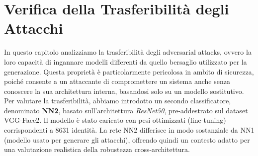 \chapter{Verifica della Trasferibilità degli Attacchi}
    In questo capitolo analizziamo la trasferibilità degli adversarial attacks, ovvero la loro capacità di ingannare modelli differenti da quello bersaglio utilizzato per la generazione. Questa proprietà è particolarmente pericolosa in ambito di sicurezza, poiché consente a un attaccante di compromettere un sistema anche senza conoscere la sua architettura interna, basandosi solo su un modello sostitutivo.
    Per valutare la trasferibilità, abbiamo introdotto un secondo classificatore, denominato \textbf{NN2}, basato sull’architettura \textit{ResNet50}, pre-addestrato sul dataset VGG-Face2. Il modello è stato caricato con pesi ottimizzati (fine-tuning) corrispondenti a 8631 identità. La rete NN2 differisce in modo sostanziale da NN1 (modello usato per generare gli attacchi), offrendo quindi un contesto adatto per una valutazione realistica della robustezza cross-architettura.

